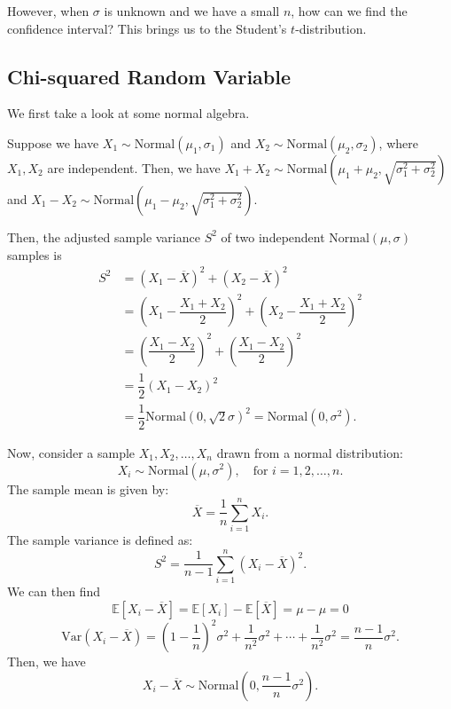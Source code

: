 However, when \(\sigma\) is unknown and we have a small \(n\), how can we find the confidence interval? This brings us to the Student's \(t\)-distribution.



\subsection{Chi-squared Random Variable}
We first take a look at some normal algebra. 

Suppose we have \(X_1 \sim \text{Normal}(\mu_1, \sigma_1)\) and \(X_2 \sim \text{Normal}(\mu_2, \sigma_2)\), where \(X_1, X_2\) are independent. Then, we have \(X_1 + X_2 \sim \text{Normal}(\mu_1 + \mu_2, \sqrt{\sigma_1^2 + \sigma_2^2})\) and \(X_1 - X_2 \sim \text{Normal}(\mu_1 - \mu_2, \sqrt{\sigma_1^2 + \sigma_2^2})\).

Then, the adjusted sample variance \(S^2\) of two independent \(\text{Normal}(\mu, \sigma)\) samples is 
\[
  \begin{aligned}
    S^2 &= (X_1 - \overline{X})^2 + (X_2 - \overline{X})^2 \\
    &= (X_1 - \dfrac{X_1 + X_2}{2})^2 + (X_2 - \dfrac{X_1 + X_2}{2})^2 \\
    &= \left(\dfrac{X_1 - X_2}{2}\right)^2 + \left(\dfrac{X_1 - X_2}{2}\right)^2 \\
    &= \dfrac{1}{2}(X_1 - X_2)^2 \\
    &= \dfrac{1}{2} \text{Normal}(0, \sqrt{2}\sigma)^2 = \text{Normal}(0, \sigma^2).
  \end{aligned}
\]

Now, consider a sample \( X_1, X_2, \dots, X_n \) drawn from a normal distribution:
\[
X_i \sim \text{Normal}(\mu, \sigma^2), \quad \text{for } i = 1, 2, \dots, n.
\]
The sample mean is given by:
\[
\overline{X} = \frac{1}{n} \sum_{i=1}^{n} X_i.
\]
The sample variance is defined as:
\[
S^2 = \frac{1}{n-1} \sum_{i=1}^{n} (X_i - \overline{X})^2.
\]
We can then find 
\[
  \mathbb{E}[X_i - \overline{X}] = \mathbb{E}[X_i] - \mathbb{E}[\overline{X}] = \mu - \mu = 0
\]
\[
  \text{Var}(X_i - \overline{X}) = \left(1 - \frac{1}{n}\right)^2\sigma^2 + \frac{1}{n^2} \sigma^2 + \cdots + \frac{1}{n^2} \sigma^2 = \frac{n - 1}{n} \sigma^2.
\]
Then, we have 
\[
  X_i - \overline{X} \sim \text{Normal}\left(0, \frac{n - 1}{n} \sigma^2\right).
\]

